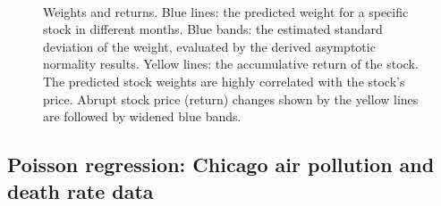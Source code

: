 \documentclass[aos]{imsart}
\numberwithin{equation}{section}
\theoremstyle{plain}
\begin{document}
\begin{figure}[ht]
{    }\
    \
    \caption{		
             Weights and returns. Blue lines: the predicted weight for a specific stock in different months. Blue bands: the estimated standard deviation of the weight, evaluated by the derived asymptotic normality results. Yellow lines: the accumulative return of the stock. The predicted stock weights are highly correlated with the stock's price. Abrupt stock price (return) changes shown by the yellow lines are followed by widened blue bands.
            }	
    \label{fig:portfolio}
\end{figure}




\subsection{Poisson regression: Chicago air pollution and death rate data}
\label{sec:poisson_regression}
\end{document}
